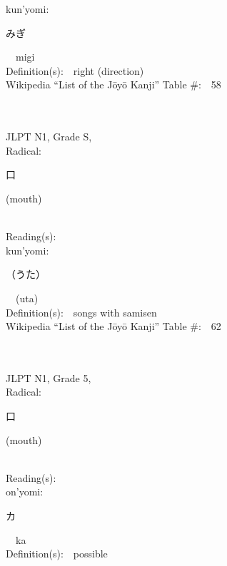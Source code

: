 \begin{multicols}{2}
{\hspace*{1em}}kun'yomi:\ \ \\
{\hspace*{2em}}{\begin{CJK}{UTF8}{min} みぎ \end{CJK}}\ \ migi\ \ \\
Definition(s):\ \ right (direction) \\
Wikipedia ``List of the J\=oy\=o Kanji'' Table \#:\ \ 58 \\
\ \ \\
{\fontsize{34pt}{40pt}  }\ \ \\
{JLPT N1, Grade S, \\Radical:\ \ {\begin{CJK}{UTF8}{min} 口 \end{CJK}} (mouth) } \\
Reading(s):\ \ \\
{\hspace*{1em}}kun'yomi:\ \ \\
{\hspace*{2em}}{\begin{CJK}{UTF8}{min} （うた） \end{CJK}}\ \ (uta)\ \ \\
Definition(s):\ \ songs with samisen \\
Wikipedia ``List of the J\=oy\=o Kanji'' Table \#:\ \ 62 \\
\ \ \\
{\fontsize{34pt}{40pt}  }\ \ \\  %
{JLPT N1, Grade 5, \\Radical:\ \ {\begin{CJK}{UTF8}{min} 口 \end{CJK}} (mouth) } \\
Reading(s):\ \ \\
{\hspace*{1em}}on'yomi:\ \ \\
{\hspace*{2em}}{\begin{CJK}{UTF8}{min} カ \end{CJK}}\ \ ka\ \ \\
Definition(s):\ \ possible \\

\end{multicols}
